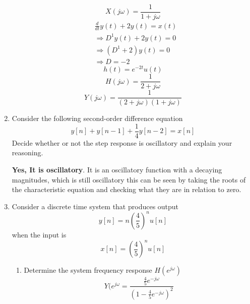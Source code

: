 \documentclass{article}
\begin{document}
\begin{enumerate}
\begin{equation}
        X(j\omega) = \frac{1}{1+j\omega}
    \end{equation}
    \begin{align}
        &\frac{d}{dt}y(t) + 2y(t) = x(t)\\
        &\Rightarrow D^1y(t) + 2y(t) = 0\\
        &\Rightarrow (D^1 + 2)y(t) = 0\\
        &\Rightarrow D = -2
    \end{align}
    \begin{equation}
        h(t) = e^{-2t}u(t)
    \end{equation}
    \begin{equation}
        H(j\omega) = \frac{1}{2+j\omega}
    \end{equation}
    \begin{equation}
        \boxed {Y(j\omega) = \frac{1}{(2+j\omega)(1+j\omega)}}
    \end{equation}
    \newpage
    \item Consider the following second-order  difference equation
    \begin{equation}
        y[n] + y[n-1] +\frac{1}{4}y[n-2] = x[n]
    \end{equation}
    Decide whether or not the step response is oscillatory and explain your reasoning.
    \begin{center}
        \textbf{Yes, It is oscillatory}. It is an oscillatory function with a decaying magnitudes, which is still oscillatory this can be seen by taking the roots of the characteristic equation and checking what they are in relation to zero.
    \end{center}
    \newpage
    \item Consider a discrete time system that produces output
    \begin{equation}
        y[n] = n\left(\frac{4}{5}\right)^nu[n]
    \end{equation}
    when the input is
    \begin{equation}
        x[n] = \left(\frac{4}{5}\right)^nu[n]
    \end{equation}
    \begin{enumerate}
        \item Determine the system frequency response $H(e^{j\omega})$
        \begin{equation}
            Y(e^{j\omega} = \frac{\frac{4}{5}e^{-j\omega}}{(1-\frac{4}{5}e^{-j\omega})^2}
        \end{equation}
        \begin{equation}

\end{equation}
\end{enumerate}
\end{enumerate}
\end{document}
